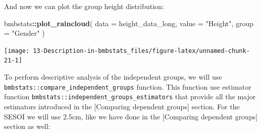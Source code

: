 \documentclass[
]{book}
\newenvironment{Shaded}{\begin{snugshade}}{\end{snugshade}}
\newcommand{\CommentTok}[1]{\textcolor[rgb]{0.56,0.35,0.01}{\textit{#1}}}
\newcommand{\DataTypeTok}[1]{\textcolor[rgb]{0.13,0.29,0.53}{#1}}
\newcommand{\KeywordTok}[1]{\textcolor[rgb]{0.13,0.29,0.53}{\textbf{#1}}}
\newcommand{\NormalTok}[1]{#1}
\newcommand{\OperatorTok}[1]{\textcolor[rgb]{0.81,0.36,0.00}{\textbf{#1}}}
\newcommand{\StringTok}[1]{\textcolor[rgb]{0.31,0.60,0.02}{#1}}
\begin{document}
\begin{Shaded}
\end{Shaded}

And now we can plot the group height distribution:

\begin{Shaded}
\begin{Highlighting}[]
\NormalTok{bmbstats}\OperatorTok{::}\KeywordTok{plot\_raincloud}\NormalTok{(}
  \DataTypeTok{data =}\NormalTok{ height\_data\_long,}
  \DataTypeTok{value =} \StringTok{"Height"}\NormalTok{,}
  \DataTypeTok{group =} \StringTok{"Gender"}
\NormalTok{)}
\end{Highlighting}
\end{Shaded}

\begin{center}\texttt{[image: 13-Description-in-bmbstats\_files/figure-latex/unnamed-chunk-21-1]} \end{center}

To perform descriptive analysis of the independent groups, we will use \texttt{bmbstats::compare\_independent\_groups} function. This function use estimator function \texttt{bmbstats::independent\_groups\_estimators} that provide all the major estimators introduced in the {[}Comparing dependent groups{]} section. For the SESOI we will use 2.5cm, like we have done in the {[}Comparing dependent groups{]} section as well:
\end{document}
